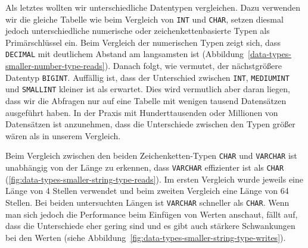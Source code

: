 Als letztes wollten wir unterschiedliche Datentypen vergleichen.
Dazu verwenden wir die gleiche Tabelle wie beim Vergleich von \texttt{INT} und \texttt{CHAR}, setzen diesmal jedoch unterschiedliche numerische oder zeichenkettenbasierte Typen als Primärschlüssel ein.
Beim Vergleich der numerischen Typen zeigt sich, dass \texttt{DECIMAL} mit deutlichem Abstand am langsamsten ist (Abbildung~\ref{data-types-smaller-number-type-reads}).
Danach folgt, wie vermutet, der nächstgrößere Datentyp \texttt{BIGINT}.
Auffällig ist, dass der Unterschied zwischen \texttt{INT}, \texttt{MEDIUMINT} und \texttt{SMALLINT} kleiner ist als erwartet.
Dies wird vermutlich aber daran liegen, dass wir die Abfragen nur auf eine Tabelle mit wenigen tausend Datensätzen ausgeführt haben.
In der Praxis mit Hunderttausenden oder Millionen von Datensätzen ist anzunehmen, dass die Unterschiede zwischen den Typen größer wären als in unserem Vergleich.

Beim Vergleich zwischen den beiden Zeichenketten-Typen \texttt{CHAR} und \texttt{VARCHAR} ist unabhängig von der Länge zu erkennen, dass \texttt{VARCHAR} effizienter ist als \texttt{CHAR} (\ref{fig:data-types-smaller-string-type-reads}).
Im ersten Vergleich wurde jeweils eine Länge von 4 Stellen verwendet und beim zweiten Vergleich eine Länge von 64 Stellen.
Bei beiden untersuchten Längen ist \texttt{VARCHAR} schneller als \texttt{CHAR}.
Wenn man sich jedoch die Performance beim Einfügen von Werten anschaut, fällt auf, dass die Unterschiede eher gering sind und es gibt auch stärkere Schwankungen bei den Werten (siehe Abbildung~\ref{fig:data-types-smaller-string-type-writes}).

